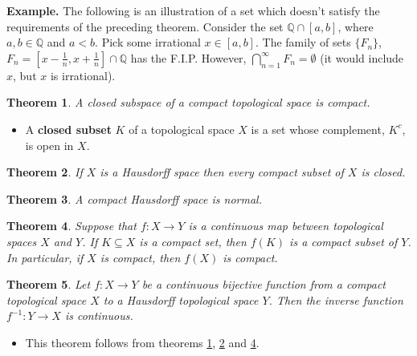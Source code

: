 \documentclass[two column]{article}
\newtheorem{theorem}{Theorem}[subsection]
\begin{document}
{\bf Example.} The following is an illustration of a set which doesn't satisfy the requirements of the preceding theorem. Consider the set $\mathbb{Q} \cap [a,b]$, where $a,b \in \mathbb{Q}$ and $a<b$. Pick some irrational $x \in [a,b]$. The family of sets $\{ F_{n} \}$, $F_{n} = [x - \frac{1}{n}, x + \frac{1}{n}] \cap \mathbb{Q}$ has the F.I.P.  However, $\bigcap_{n=1}^{\infty} F_{n} = \emptyset$ (it would include $x$, but $x$ is irrational). \\

\begin{theorem} \label{closed subspace compact}
A closed subspace of a compact topological space is compact.
\end{theorem}
\begin{itemize}
\item A {\bf closed subset} $K$ of a topological space $X$ is a set whose complement, $K^{c}$, is open in $X$. \vspace{12pt}
\end{itemize}

\begin{theorem} \label{compact subset of Hausdorff closed}
If $X$ is a Hausdorff space then every compact subset of $X$ is closed. \\
\end{theorem}

\begin{theorem}
A compact Hausdorff space is normal. \\
\end{theorem}

\begin{theorem} \label{K compact, f cts, f(K) compact}
Suppose that $f: X \rightarrow Y$ is a continuous map between topological spaces $X$ and $Y$. If $K \subseteq X$ is a compact set, then $f(K)$ is a compact subset of $Y$. In particular, if $X$ is compact, then $f(X)$ is compact. \\
\end{theorem}

\begin{theorem}
Let $f: X \rightarrow Y$ be a continuous bijective function from a compact topological space $X$ to a Hausdorff topological space $Y$. Then the inverse function $f^{-1}: Y \rightarrow X$ is continuous. 
\end{theorem}
\begin{itemize}
\item This theorem follows from theorems \ref{closed subspace compact}, \ref{compact subset of Hausdorff closed} and \ref{K compact, f cts, f(K) compact}.
\end{itemize}
\end{document}

